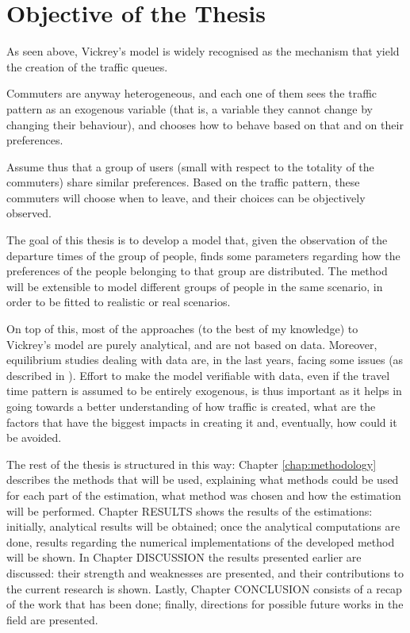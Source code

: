 \section{Objective of the Thesis}
\label{sec:thesis_obj}

As seen above,
Vickrey's model is widely recognised as the mechanism that yield the creation of the traffic queues.

Commuters are anyway heterogeneous,
and each one of them sees the traffic pattern as an exogenous variable
(that is, a variable they cannot change by changing their behaviour),
and chooses how to behave based on that and on their preferences.

Assume thus that a group of users (small with respect to the totality of the commuters) share similar preferences.
Based on the traffic pattern, these commuters will choose when to leave,
and their choices can be objectively observed.

The goal of this thesis is to develop a model that,
given the observation of the departure times of the group of people,
finds some parameters regarding how the preferences of the people belonging to that group are distributed.
The method will be extensible to model different groups of people in the same scenario,
in order to be fitted to realistic or real scenarios.

On top of this, most of the approaches (to the best of my knowledge) to Vickrey's model are purely analytical,
and are not based on data.
Moreover, equilibrium studies dealing with data are, in the last years, facing some issues (as described in \cite{https://doi.org/10.1111/iere.12692}).
Effort to make the model verifiable with data,
even if the travel time pattern is assumed to be entirely exogenous,
is thus important as it helps in going towards a better understanding of how traffic is created,
what are the factors that have the biggest impacts in creating it and, eventually,
how could it be avoided.

The rest of the thesis is structured in this way:
Chapter \ref{chap:methodology} describes the methods that will be used,
explaining what methods could be used for each part of the estimation,
what method was chosen and how the estimation will be performed.
Chapter RESULTS shows the results of the estimations:
initially, analytical results will be obtained;
once the analytical computations are done,
results regarding the numerical implementations of the developed method will be shown.
In Chapter DISCUSSION the results presented earlier are discussed:
their strength and weaknesses are presented,
and their contributions to the current research is shown.
Lastly, Chapter CONCLUSION consists of a recap of the work that has been done;
finally, directions for possible future works in the field are presented.

